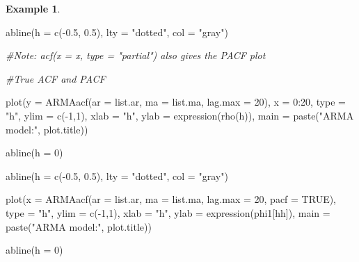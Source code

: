 \documentclass[
]{book}
\newenvironment{Shaded}{\begin{snugshade}}{\end{snugshade}}
\newcommand{\AttributeTok}[1]{\textcolor[rgb]{0.77,0.63,0.00}{#1}}
\newcommand{\CommentTok}[1]{\textcolor[rgb]{0.56,0.35,0.01}{\textit{#1}}}
\newcommand{\ConstantTok}[1]{\textcolor[rgb]{0.00,0.00,0.00}{#1}}
\newcommand{\DecValTok}[1]{\textcolor[rgb]{0.00,0.00,0.81}{#1}}
\newcommand{\FloatTok}[1]{\textcolor[rgb]{0.00,0.00,0.81}{#1}}
\newcommand{\FunctionTok}[1]{\textcolor[rgb]{0.00,0.00,0.00}{#1}}
\newcommand{\NormalTok}[1]{#1}
\newcommand{\SpecialCharTok}[1]{\textcolor[rgb]{0.00,0.00,0.00}{#1}}
\newcommand{\StringTok}[1]{\textcolor[rgb]{0.31,0.60,0.02}{#1}}
\theoremstyle{definition}
\theoremstyle{definition}
\newtheorem{example}{Example}[chapter]
\theoremstyle{definition}
\theoremstyle{definition}
\theoremstyle{remark}
\begin{document}
\begin{example}
\begin{Shaded}
\begin{Highlighting}[]
\FunctionTok{abline}\NormalTok{(}\AttributeTok{h =} \FunctionTok{c}\NormalTok{(}\SpecialCharTok{{-}}\FloatTok{0.5}\NormalTok{, }\FloatTok{0.5}\NormalTok{), }\AttributeTok{lty =} \StringTok{"dotted"}\NormalTok{, }\AttributeTok{col =} \StringTok{"gray"}\NormalTok{)}
  
\CommentTok{\#Note: acf(x = x, type = "partial") also gives the PACF plot}


\CommentTok{\#True ACF and PACF}
  
\FunctionTok{plot}\NormalTok{(}\AttributeTok{y =} \FunctionTok{ARMAacf}\NormalTok{(}\AttributeTok{ar =}\NormalTok{ list.ar, }\AttributeTok{ma =}\NormalTok{ list.ma, }\AttributeTok{lag.max =} 
       \DecValTok{20}\NormalTok{), }\AttributeTok{x =} \DecValTok{0}\SpecialCharTok{:}\DecValTok{20}\NormalTok{, }\AttributeTok{type =} \StringTok{"h"}\NormalTok{, }\AttributeTok{ylim =} \FunctionTok{c}\NormalTok{(}\SpecialCharTok{{-}}\DecValTok{1}\NormalTok{,}\DecValTok{1}\NormalTok{), }\AttributeTok{xlab =} 
       \StringTok{"h"}\NormalTok{, }\AttributeTok{ylab =} \FunctionTok{expression}\NormalTok{(}\FunctionTok{rho}\NormalTok{(h)), }\AttributeTok{main =} \FunctionTok{paste}\NormalTok{(}\StringTok{"ARMA }
\StringTok{       model:"}\NormalTok{, plot.title))}
  
\FunctionTok{abline}\NormalTok{(}\AttributeTok{h =} \DecValTok{0}\NormalTok{)}
  
\FunctionTok{abline}\NormalTok{(}\AttributeTok{h =} \FunctionTok{c}\NormalTok{(}\SpecialCharTok{{-}}\FloatTok{0.5}\NormalTok{, }\FloatTok{0.5}\NormalTok{), }\AttributeTok{lty =} \StringTok{"dotted"}\NormalTok{, }\AttributeTok{col =} \StringTok{"gray"}\NormalTok{)}
  
\FunctionTok{plot}\NormalTok{(}\AttributeTok{x =} \FunctionTok{ARMAacf}\NormalTok{(}\AttributeTok{ar =}\NormalTok{ list.ar, }\AttributeTok{ma =}\NormalTok{ list.ma, }\AttributeTok{lag.max =} 
       \DecValTok{20}\NormalTok{, }\AttributeTok{pacf =} \ConstantTok{TRUE}\NormalTok{), }\AttributeTok{type =} \StringTok{"h"}\NormalTok{, }\AttributeTok{ylim =} \FunctionTok{c}\NormalTok{(}\SpecialCharTok{{-}}\DecValTok{1}\NormalTok{,}\DecValTok{1}\NormalTok{), }\AttributeTok{xlab =} 
       \StringTok{"h"}\NormalTok{, }\AttributeTok{ylab =} \FunctionTok{expression}\NormalTok{(phi1[hh]), }\AttributeTok{main =} \FunctionTok{paste}\NormalTok{(}\StringTok{"ARMA }
\StringTok{       model:"}\NormalTok{, plot.title))}
  
\FunctionTok{abline}\NormalTok{(}\AttributeTok{h =} \DecValTok{0}\NormalTok{)}
  

\end{Highlighting}
\end{Shaded}
\end{example}
\end{document}
